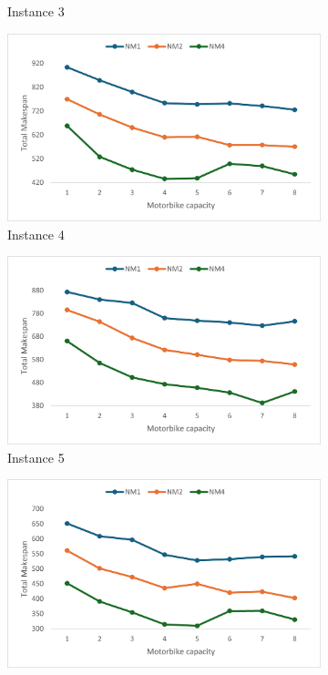 \documentclass{article}
\begin{document}
\begin{figure}[h]
\begin{subfigure}{0.33\textwidth}
			\caption{Instance 3}
			\label{fig:p03_avg}
		\end{subfigure}
		\par
		\bigskip
		\begin{subfigure}{0.33\textwidth}
			\centering
			\includegraphics[scale=0.42]{Instance4}\;
			\caption{Instance 4}
			\label{fig:p04_avg}
		\end{subfigure}
		\begin{subfigure}{0.33\textwidth}
			\centering
			\includegraphics[scale=0.42]{Instance5}\;
			\caption{Instance 5}
			\label{fig:p05_avg}
		\end{subfigure}
		\begin{subfigure}{0.33\textwidth}
			\centering
			\includegraphics[scale=0.42]{Instance6}\;

\end{subfigure}
\end{figure}
\end{document}

